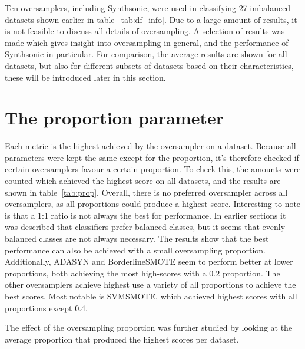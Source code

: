 
Ten oversamplers, including Synthsonic, were used in classifying 27 imbalanced datasets shown earlier in table~\ref{tab:df_info}. Due to a large amount of results, it is not feasible to discuss all details of oversampling. A selection of results was made which gives insight into oversampling in general, and the performance of Synthsonic in particular. For comparison, the average results are shown for all datasets, but also for different subsets of datasets based on their characteristics, these will be introduced later in this section.

\section{The proportion parameter}
Each metric is the highest achieved by the oversampler on a dataset. Because all parameters were kept the same except for the proportion, it's therefore checked if certain oversamplers favour a certain proportion. To check this, the amounts were counted which achieved the highest score on all datasets, and the results are shown in table~\ref{tab:prop}. Overall, there is no preferred oversampler across all oversamplers, as all proportions could produce a highest score. Interesting to note is that a 1:1 ratio is not always the best for performance. In earlier sections it was described that classifiers prefer balanced classes, but it seems that evenly balanced classes are not always necessary. The results show that the best performance can also be achieved with a small oversampling proportion. Additionally, ADASYN and BorderlineSMOTE seem to perform better at lower proportions, both achieving the most high-scores with a 0.2 proportion. The other oversamplers achieve highest use a variety of all proportions to achieve the best scores. Most notable is SVMSMOTE, which achieved highest scores with all proportions except 0.4. 

The effect of the oversampling proportion was further studied by looking at the average proportion that produced the highest scores per dataset. 

